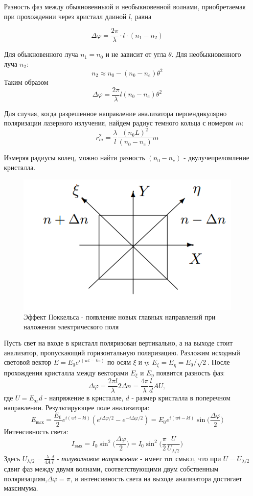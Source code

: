 \documentclass[a4paper,12pt]{article}
\begin{document}
Разность фаз между обыкновенныой и необыкновенной волнами, приобретаемая при прохождении через кристалл длиной $l$, равна

\begin{equation}
    \Delta\varphi=\frac{2\pi}{\lambda}\cdot l \cdot (n_1-n_2)
\end{equation}

Для обыкновенного луча $n_1=n_0$ и не зависит от угла $\theta$. Для необыкновенного луча $n_2$:
$$
n_2 \approx n_0-(n_0-n_e)\theta^2
$$
Таким образом 
$$
\Delta\varphi=\frac{2\pi}{\lambda}l(n_0-n_e)\theta^2
$$

Для случая, когда разрешенное направление анализатора перпендикулярно поляризации лазерного излучения, найдем радиус темного кольца с номером $m$:
\begin{equation}
    r_m^2=\frac{\lambda}{l}\frac{(n_0L)^2}{(n_0-n_e)}m
\end{equation}

Измеряя радиусы колец, можно найти разность $(n_0-n_e)$ - двулучепреломление кристалла.

\begin{figure}[h]
\centering
\includegraphics[width=0.6\linewidth]{img2.png}
\caption{Эффект Поккельса - появление новых главных направлений при наложении электрического поля}
\label{img2}
\end{figure}

Пусть свет на входе в кристалл поляризован вертикально, а на выходе стоит анализатор, пропускающий горизонтальную поляризацию. Разложим исходный световой вектор $E=E_0e^{i(wt-kz)}$ по осям $\xi$ и $\eta$: $E_\xi=E_\eta=E_0/\sqrt{2}$. После прохождения кристалла между векторами $E_\xi$ и $E_\eta$ появится разность фаз:
$$
\Delta\varphi=\frac{2\pi l}{\lambda}2\Delta n=\frac{4\pi}{\lambda}\frac{l}{d}AU,
$$
где $U=E_\text{эл}d$ - напряжение в кристалле, $d$ - размер кристалла в поперечном направлении. Результирующее поле анализатора:
$$
E_\text{вых}=\frac{E_0}{2}e^{i(wt-kl)}(e^{i\Delta\varphi/2}-e^{-i\Delta\varphi/2})=E_0e^{i(wt-kl)}\sin{\Big(\frac{\Delta\varphi}{2}\Big)}
$$
Интенсивность света:
\begin{equation}
    I_\text{вых}=I_0\sin^2{\Big(\frac{\Delta\varphi}{2} \Big)}=I_0\sin^2{\Big(\frac{\pi}{2}\frac{U}{U_{\lambda/2}} \Big)}
\end{equation}
Здесь $U_{\lambda/2}=\frac{\lambda}{4A}\frac{d}{l}$ - \textit{полуволновое напряжение} - имеет тот смысл, что при $U=U_{\lambda/2}$ сдвиг фаз между двумя волнами, соответствующими двум собственным поляризациям,$\Delta\varphi=\pi$, и интенсивность света на выходе анализатора достигает максимума.
\end{document}
